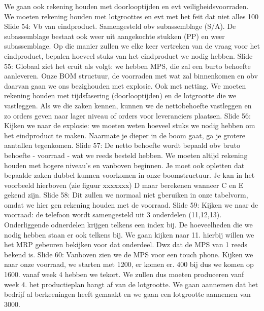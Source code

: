 \documentclass[10pt,a4paper]{report}
\begin{document}
We gaan ook rekening houden met doorlooptijden en evt veiligheidsvoorraden. We moeten rekening houden met lotgroottes en evt met het feit dat niet alles 100%
Slide 54: Vb van eindproduct. Samengesteld obv subassemblage (S/A). De subassemblage bestaat ook weer uit aangekochte stukken (PP) en weer subassemblage. Op die manier zullen we elke keer vertreken van de vraag voor het eindproduct, bepalen hoeveel stuks van het eindproduct we nodig hebben.
Slide 55: Globaal ziet het eruit als volgt: we hebben MPS, die zal een burto behoefte aanleveren. Onze BOM structuur, de voorraden met wat zal binnenkomen en obv daarvan gaan we ons bezighouden met explosie. Ook met netting. We moeten rekening houden met tijdsfasering (doorlooptijden) en de lotgrootte die we vastleggen. Als we die zaken kennen, kunnen we de nettobehoefte vastleggen en zo orders geven naar lager niveau of orders voor leveranciers plaatsen. 
Slide 56: Kijken we naar de explosie: we moeten weten hoeveel stuks we nodig hebben om het eindproduct te maken. Naarmate je dieper in de boom gaat, ga je grotere aantallen tegenkomen. 
Slide 57: De netto behoefte wordt bepaald obv bruto behoefte - voorraad - wat we reeds besteld hebben.
We moeten altijd rekening houden met hogere niveau's en vanboven beginnen. Je moet ook opletten dat bepaalde zaken dubbel kunnen voorkomen in onze boomstructuur. Je kan in het voorbeeld hierboven (zie figuur xxxxxxx) D maar berekenen wanneer C en E gekend zijn. 
Slide 58: Dit zullen we normaal niet gberuiken in onze tabelvorm, omdat we hier gen rekening houden met de voorraad. 
Slide 59: Kijken we naar de voorraad: de telefoon wordt samengesteld uit 3 onderdelen (11,12,13). Onderliggende odnerdelen krijgen telkens een index bij. De hoeveelheden die we nodig hebben staan er ook telkens bij.
We gaan kijken naar 11. hierbij willen we het MRP gebeuren bekijken voor dat onderdeel. Dwz dat de MPS van 1 reeds bekend is.
Slide 60: Vanboven zien we de MPS voor een touch phone. Kijken we naar onze voorraad, we starten met 1200, er komen er. 400 bij dus we komen op 1600. vanaf week 4 hebben we tekort. We zullen dus moeten produceren vanf week 4. het productieplan hangt af van de lotgrootte. We gaan aannemen dat het bedrijf al berkeeningen heeft gemaakt en we gaan een lotgrootte aannemen van 3000. 
\end{document}
